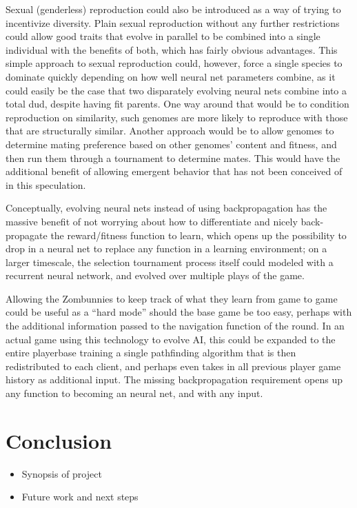 \documentclass[letterpaper]{article}
\begin{document}
Sexual (genderless) reproduction could also be introduced as a way of trying to
incentivize diversity. Plain sexual reproduction without any further restrictions
could allow good traits that evolve in parallel to be combined into a single
individual with the benefits of both, which has fairly obvious advantages.
This simple approach to sexual reproduction could, however, force a single
species to dominate quickly depending on how well neural net parameters combine,
as it could easily be the case that two disparately evolving neural nets combine
into a total dud, despite having fit parents. One way around that would be to
condition reproduction on similarity, such genomes are more likely to reproduce
with those that are structurally similar. Another approach would be to allow
genomes to determine mating preference based on other genomes' content and
fitness, and then run them through a tournament to determine mates. This would
have the additional benefit of allowing emergent behavior that has not been
conceived of in this speculation.

Conceptually, evolving neural nets instead of using backpropagation
has the massive benefit of not worrying about how to differentiate and nicely
back-propagate the reward/fitness function to learn, which opens up the
possibility to drop in a neural net to replace any function in a learning
environment; on a larger timescale, the selection tournament process itself
could modeled with a recurrent neural network, and evolved over multiple plays
of the game.

Allowing the Zombunnies to keep track of what they learn from game to game could
be useful as a ``hard mode'' should the base game be too easy, perhaps with the
additional information passed to the navigation function of the round. In an actual game
using this technology to evolve AI, this could be expanded to the entire
playerbase training a single pathfinding algorithm that is then redistributed to
each client, and perhaps even takes in all previous player game history as
additional input. The missing backpropagation requirement opens up
any function to becoming an neural net, and with any input.

\section{Conclusion}
\begin{itemize}
    \item Synopsis of project
    \item Future work and next steps
\end{itemize}
\end{document}
